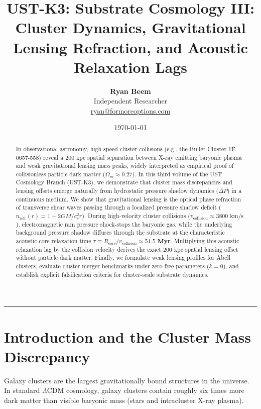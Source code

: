 \documentclass[11pt,a4paper]{article}
\title{\Large\bfseries UST-K3: Substrate Cosmology III: Cluster Dynamics, Gravitational Lensing Refraction, and Acoustic Relaxation Lags}
\author{
	\textbf{Ryan Beem}\\[0.5em]
	\small Independent Researcher \\
	\small \href{mailto:ryan@formoreoptions.com}{ryan@formoreoptions.com}
}
\date{\today}
\begin{document}
	
	\maketitle
	
	\begin{abstract}
		In observational astronomy, high-speed cluster collisions (e.g., the Bullet Cluster 1E 0657-558) reveal a $200 \text{ kpc}$ spatial separation between X-ray emitting baryonic plasma and weak gravitational lensing mass peaks, widely interpreted as empirical proof of collisionless particle dark matter ($\Omega_m \approx 0.27$). In this third volume of the UST Cosmology Branch (UST-K3), we demonstrate that cluster mass discrepancies and lensing offsets emerge naturally from hydrostatic pressure shadow dynamics ($\Delta P$) in a continuous medium. We show that gravitational lensing is the optical phase refraction of transverse shear waves passing through a localized pressure shadow deficit ($n_{\text{refr}}(r) = 1 + 2GM/c_s^2 r$). During high-velocity cluster collisions ($v_{\text{collision}} \approx 3800 \text{ km/s}$), electromagnetic ram pressure shock-stops the baryonic gas, while the underlying background pressure shadow diffuses through the substrate at the characteristic acoustic core relaxation time $\tau \equiv R_{\text{core}} / v_{\text{collision}} \approx \mathbf{51.5 \text{ Myr}}$. Multiplying this acoustic relaxation lag by the collision velocity derives the exact $200 \text{ kpc}$ spatial lensing offset without particle dark matter. Finally, we formulate weak lensing profiles for Abell clusters, evaluate cluster merger benchmarks under zero free parameters ($k=0$), and establish explicit falsification criteria for cluster-scale substrate dynamics.
	\end{abstract}
	
	\vspace{1em}
	\hrule
	\vspace{1.5em}
	
	\section{Introduction and the Cluster Mass Discrepancy}
	\label{sec:intro}
	
	Galaxy clusters are the largest gravitationally bound structures in the universe. In standard $\Lambda\text{CDM}$ cosmology, galaxy clusters contain roughly six times more dark matter than visible baryonic mass (stars and intracluster X-ray plasma).
	
\end{document}
